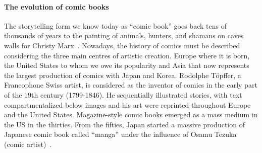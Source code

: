 






\paragraph{The evolution of comic books}

The storytelling form we know today as ``comic book'' goes back tens of thousands of years to the painting of animals, hunters, and shamans on caves walls for Christy Marx~\cite{Marx2007Writing}.
Nowadays, the history of comics must be described considering the three main centres of artistic creation.
Europe where it is born, the United States to whom we owe its popularity and Asia that now represents the largest production of comics with Japan and Korea.
Rodolphe Töpffer, a Francophone Swiss artist, is considered as the inventor of comics in the early part of the 19th century (1799-1846).
He sequentially illustrated stories, with text compartmentalized below images and his art were reprinted throughout Europe and the United States.
Magazine-style comic books emerged as a mass medium in the US in the thirties.
From the fifties, Japan started a massive production of Japanese comic book called ``manga'' under the influence of Osamu Tezuka (comic artist)~\cite{Chrysoline2014}.

